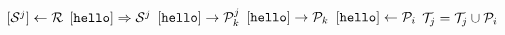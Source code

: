 \documentclass{article}
\begin{document}
\pagestyle{empty}

\newcommand{\send}{\Rightarrow}
\newcommand{\sendto}{\rightarrow}
\algrenewcommand{}

\begin{algorithmic}
  \State $[{\cal S}^j] \gets {\cal R}$
  \State $[\mathtt{hello}] \send {\cal S}^j$
  \State $[\mathtt{hello}]\sendto {\cal P}^j_k$
  \EndFor
  \State $[\mathtt{hello}] \sendto {\cal P}_k$
  \EndFor
  \EndProcedure
  \newline
  \State $[\mathtt{hello}] \gets {\cal P}_i$
  \State ${\cal T}_j = {\cal T}_j \cup {\cal P}_i$
  \EndWhile
  \EndProcedure
  
\end{algorithmic}
\end{document}
